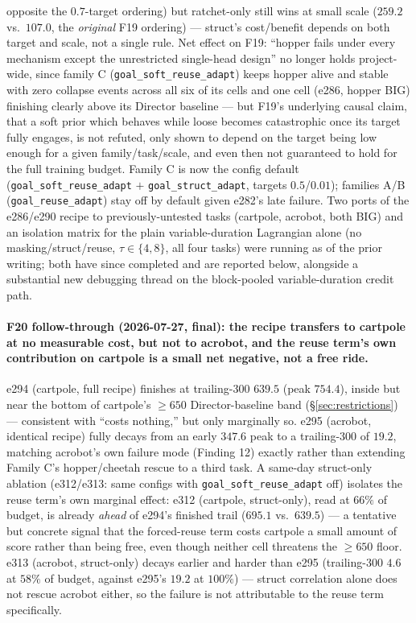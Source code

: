 \documentclass[10pt]{article}
\begin{document}
opposite the $0.7$-target ordering) but ratchet-only still wins at small
scale ($259.2$ vs.\ $107.0$, the \emph{original} F19 ordering) --- struct's
cost/benefit depends on both target and scale, not a single rule. Net effect
on F19: ``hopper fails under every mechanism except the unrestricted
single-head design'' no longer holds project-wide, since family C
(\texttt{goal\_soft\_reuse\_adapt}) keeps hopper alive and stable with zero
collapse events across all six of its cells and one cell (e286, hopper BIG)
finishing clearly above its Director baseline --- but F19's underlying
causal claim, that a soft prior which behaves while loose becomes
catastrophic once its target fully engages, is not refuted, only shown to
depend on the target being low enough for a given family/task/scale, and
even then not guaranteed to hold for the full training budget. Family C is
now the config default (\texttt{goal\_soft\_reuse\_adapt} $+$
\texttt{goal\_struct\_adapt}, targets $0.5$/$0.01$); families A/B
(\texttt{goal\_reuse\_adapt}) stay off by default given e282's late failure.
Two ports of the e286/e290 recipe to previously-untested tasks (cartpole,
acrobot, both BIG) and an isolation matrix for the plain variable-duration
Lagrangian alone (no masking/struct/reuse, $\tau\in\{4,8\}$, all four tasks)
were running as of the prior writing; both have since completed and are
reported below, alongside a substantial new debugging thread on the
block-pooled variable-duration credit path.

\paragraph{F20 follow-through (2026-07-27, final): the recipe transfers to
cartpole at no measurable cost, but not to acrobot, and the reuse term's own
contribution on cartpole is a small net negative, not a free ride.} e294
(cartpole, full recipe) finishes at trailing-300 $639.5$ (peak $754.4$),
inside but near the bottom of cartpole's $\geq\!650$ Director-baseline band
(\S\ref{sec:restrictions}) --- consistent with ``costs nothing,'' but only
marginally so. e295 (acrobot, identical recipe) fully decays from an early
$347.6$ peak to a trailing-300 of $19.2$, matching acrobot's own failure
mode (Finding 12) exactly rather than extending Family C's hopper/cheetah
rescue to a third task. A same-day struct-only ablation (e312/e313: same
configs with \texttt{goal\_soft\_reuse\_adapt} off) isolates the reuse
term's own marginal effect: e312 (cartpole, struct-only), read at $66\%$ of
budget, is already \emph{ahead} of e294's finished trail ($695.1$ vs.\
$639.5$) --- a tentative but concrete signal that the forced-reuse term
costs cartpole a small amount of score rather than being free, even though
neither cell threatens the $\geq\!650$ floor. e313 (acrobot, struct-only)
decays earlier and harder than e295 (trailing-300 $4.6$ at $58\%$ of budget,
against e295's $19.2$ at $100\%$) --- struct correlation alone does not
rescue acrobot either, so the failure is not attributable to the reuse term
specifically.
\end{document}
